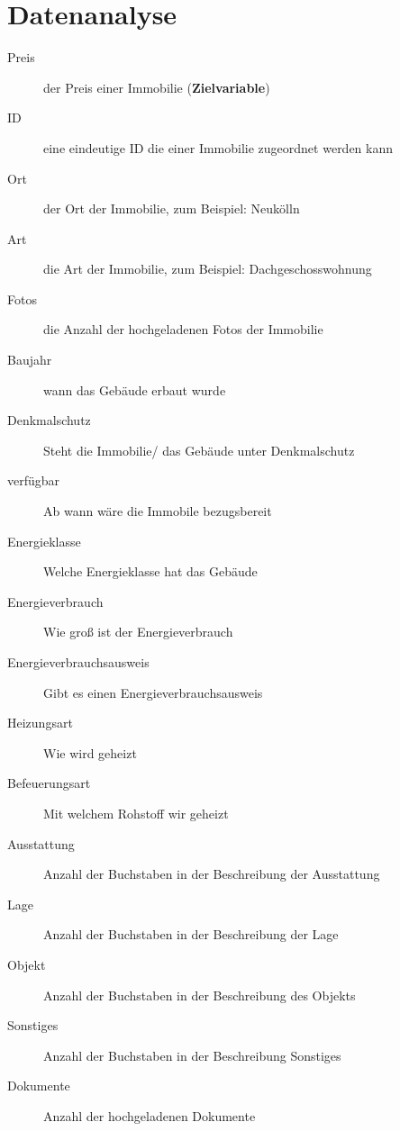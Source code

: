 	\section{Datenanalyse}\label{sec:Datenanalyse}
	
	\begin{description}
		\item[Preis] der Preis einer Immobilie (\textbf{Zielvariable})
		\item[ID] eine eindeutige ID die einer Immobilie zugeordnet werden kann
		\item[Ort] der Ort der Immobilie, zum Beispiel: Neukölln
		\item[Art] die Art der Immobilie, zum Beispiel: Dachgeschosswohnung
		\item[Fotos] die Anzahl der hochgeladenen Fotos der Immobilie
		\item[Baujahr] wann das Gebäude erbaut wurde 
		\item[Denkmalschutz] Steht die Immobilie/ das Gebäude unter Denkmalschutz
		\item[verfügbar] Ab wann wäre die Immobile bezugsbereit 
		\item[Energieklasse] Welche Energieklasse hat das Gebäude
		\item[Energieverbrauch] Wie groß ist der Energieverbrauch
		\item[Energieverbrauchsausweis] Gibt es einen Energieverbrauchsausweis
		\item[Heizungsart] Wie wird geheizt
		\item[Befeuerungsart] Mit welchem Rohstoff wir geheizt
		\item[Ausstattung] Anzahl der Buchstaben in der Beschreibung der Ausstattung
		\item[Lage] Anzahl der Buchstaben in der Beschreibung der Lage
		\item[Objekt] Anzahl der Buchstaben in der Beschreibung des Objekts
		\item[Sonstiges] Anzahl der Buchstaben in der Beschreibung Sonstiges
		\item[Dokumente] Anzahl der hochgeladenen Dokumente
	\end{description}

